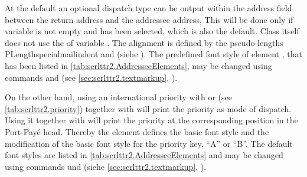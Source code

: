 %
At the default  an optional dispatch
type can be output within the
address field between the return address and the addressee address, This will
be done only if variable  is not empty and
 has been
selected, which is also the default. Class  itself does not use
the  of variable . The alignment is
defined by the pseudo-lengths PLength{specialmailindent} and
 (siehe
). The predefined
font style of element
, that has been
listed in \autoref{tab:scrlttr2.AddresseeElements}, may be changed using
commands  and  (see
\autoref{sec:scrlttr2.textmarkup},
).%
%

%
%
On the other hand, using an international priority
with  or
 (see \autoref{tab:scrlttr2.priority}) together with
 will print the priority as mode of
dispatch. Using it together with
 will print
the priority at the corresponding position in the Port-Pay\'e head. Thereby
the element  defines the basic font style and
 the modification of the basic font style for the
priority key, ``A'' or ``B''. The default font styles are listed in
\autoref{tab:scrlttr2.AddresseeElements} and may be changed using commands  und  (siehe
\autoref{sec:scrlttr2.textmarkup},
).%
%
%

